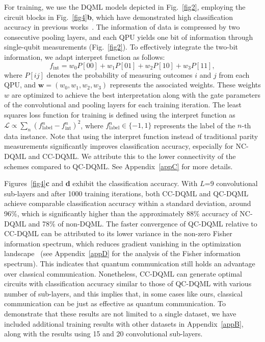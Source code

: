 \documentclass[aps,prx,reprint,amsmath,amssymb,superscriptaddress,nobibnotes,showpacs]{revtex4-2}
\begin{document}
For training, we use the DQML models depicted in Fig.~\ref{fig2}, employing the circuit blocks in Fig.~\ref{fig4}\textbf{b}, which have demonstrated high classification accuracy in previous works~\cite{hur2022quantum,sim2019expressibility}. The information of data is compressed by two consecutive pooling layers, and each QPU yields one bit of information through single-qubit measurements (Fig.~\ref{fig2}). To effectively integrate the two-bit information, we adapt interpret function as follows:
\begin{equation}
\label{interpret}
f_\mathrm{int}=w_0 P[00]+w_1 P[01]+w_2 P[10]+w_3 P[11],
\end{equation}
where $P[ij]$ denotes the probability of measuring outcomes
$i$ and $j$ from each QPU, and $\boldsymbol{w}=(w_0,w_1,w_2,w_3)$ represents the associated weights. These weights $w$ are optimized to achieve the best interpretation along with the gate parameters of the convolutional and pooling layers for each training iteration. The least squares loss function for training is defined using the interpret function as $\mathcal{L}\propto\sum_n (f^n_\mathrm{label}-f^n_\mathrm{int})^2$, where $f^n_\mathrm{label}\in\{-1,1\}$ represents the label of the $n$-th data instance. Note that using the interpret function instead of traditional parity measurements significantly improves classification accuracy, especially for NC-DQML and CC-DQML. We attribute this to the lower connectivity of the schemes compared to QC-DQML. See Appendix~\ref{appC} for more details.

Figures~\ref{fig4}\textbf{c} and \textbf{d} exhibit the classification accuracy. With $L$=9 convolutional sub-layers and after 1000 training iterations, both CC-DQML and QC-DQML achieve comparable classification accuracy within a standard deviation, around 96\%, which is significantly higher than the approximately 88\% accuracy of NC-DQML and 78\% of non-DQML. The faster convergence of QC-DQML relative to CC-DQML can be attributed to its lower variance in the non-zero Fisher information spectrum, which reduces gradient vanishing in the optimization landscape~\cite{haug2021capacity,huembeli2021characterizing} (see Appendix~\ref{appD} for the analysis of the Fisher information spectrum). This indicates that quantum communication still holds an advantage over classical communication. Nonetheless, CC-DQML can generate optimal circuits with classification accuracy similar to those of QC-DQML with various number of sub-layers, and this implies that, in some cases like ours, classical communication can be just as effective as quantum communication. To demonstrate that these results are not limited to a single dataset, we have included additional training results with other datasets in Appendix~\ref{appB}, along with the results using 15 and 20 convolutional sub-layers.\\
\end{document}
